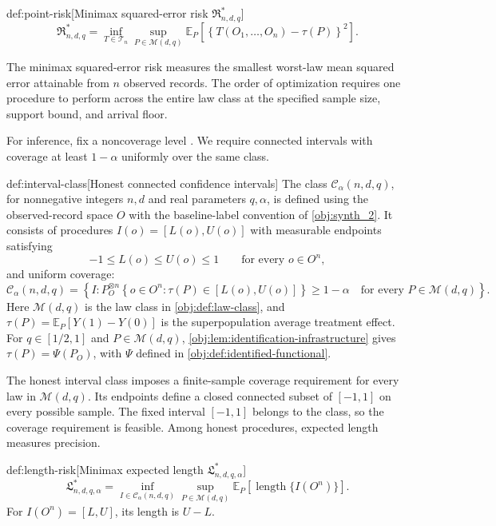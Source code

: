 \documentclass[11pt]{article}
\begin{document}
\begin{definitionv}{def:point-risk}[Minimax squared-error risk \(\mathfrak R^*_{n,d,q}\)]
\[
\mathfrak R^*_{n,d,q}
=
\inf_{T\in\mathcal T_n}
\sup_{P\in\mathcal M(d,q)}
\mathbb E_P
\left[
\left\{
T(O_1,\ldots,O_n)-\tau(P)
\right\}^2
\right].
\]
\end{definitionv}

The minimax squared-error risk  measures the smallest worst-law mean squared error attainable from \(n\) observed records. The order of optimization requires one procedure to perform across the entire law class at the specified sample size, support bound, and arrival floor.

For inference, fix a noncoverage level . We require connected intervals with coverage at least \(1-\alpha\) uniformly over the same class.

\begin{definitionv}{def:interval-class}[Honest connected confidence intervals]
The class \(\mathcal C_\alpha(n,d,q)\), for nonnegative integers \(n,d\) and real parameters \(q,\alpha\), is defined using the observed-record space \(O\) with the baseline-label convention of \cref{obj:synth_2}. It consists of procedures \(I(o)=[L(o),U(o)]\) with measurable endpoints satisfying
\[
-1\le L(o)\le U(o)\le1
\qquad\text{for every }o\in O^n,
\]
and uniform coverage:
\[
\mathcal C_\alpha(n,d,q)
=
\left\{
I:
P_O^{\otimes n}\!\left\{
o\in O^n:\tau(P)\in[L(o),U(o)]
\right\}\ge1-\alpha
\quad\text{for every }P\in\mathcal M(d,q)
\right\}.
\]
Here \(\mathcal M(d,q)\) is the law class in \cref{obj:def:law-class}, and \(\tau(P)=\mathbb E_P[Y(1)-Y(0)]\) is the superpopulation average treatment effect. For \(q\in[1/2,1]\) and \(P\in\mathcal M(d,q)\), \cref{obj:lem:identification-infrastructure} gives \(\tau(P)=\Psi(P_O)\), with \(\Psi\) defined in \cref{obj:def:identified-functional}.
\end{definitionv}

The honest interval class  imposes a finite-sample coverage requirement for every law in \(\mathcal M(d,q)\). Its endpoints define a closed connected subset of \([-1,1]\) on every possible sample. The fixed interval \([-1,1]\) belongs to the class, so the coverage requirement is feasible. Among honest procedures, expected length measures precision.

\begin{definitionv}{def:length-risk}[Minimax expected length \(\mathfrak L^*_{n,d,q,\alpha}\)]
\[
\mathfrak L^*_{n,d,q,\alpha}
=
\inf_{I\in\mathcal C_\alpha(n,d,q)}
\sup_{P\in\mathcal M(d,q)}
\mathbb E_P
\left[
\operatorname{length}\{I(O^n)\}
\right].
\]
For \(I(O^n)=[L,U]\), its length is \(U-L\).
\end{definitionv}
\end{document}
